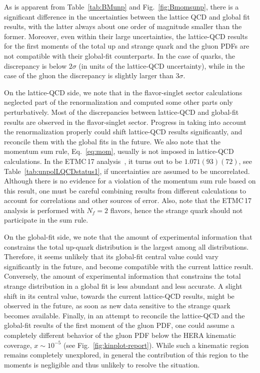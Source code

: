 As is apparent from Table~\ref{tab:BMunp} and Fig.~\ref{fig:Bmomsunp}, there is 
a significant difference in the uncertainties between the lattice QCD and 
global fit results, with the latter always about one order of magnitude 
smaller than the former.
%
Moreover, even within their large uncertainties, the lattice-QCD results 
for the first moments of the total up and strange quark and the gluon PDFs
are not compatible with their global-fit counterparts.
%
In the case of quarks, the discrepancy is below $2\sigma$ (in units of the 
lattice-QCD uncertainty), while in the case of the gluon the discrepancy is
slightly larger than $3\sigma$.

On the lattice-QCD side, we note that in the flavor-singlet sector calculations
neglected part of the renormalization and computed some other parts only 
perturbatively.
%
Most of the discrepancies between lattice-QCD and global-fit results are 
observed in the flavor-singlet sector.
%
Progress in taking into account the renormalization properly
could shift lattice-QCD results significantly, and reconcile them 
with the global fits in the future.
%
We also note that the momentum sum rule, Eq.~\eqref{eq:mom}, usually is not 
imposed in lattice-QCD calculations.
%
In the ETMC\,17 analysis~\cite{Alexandrou:2017oeh}, it turns
out to be $1.071(93)(72)$, see Table~\ref{tab:unpolLQCDstatus1}, if 
uncertainties are assumed to be uncorrelated.
%
Although there is no evidence for a violation of the momentum sum rule 
based on this result, one must be careful combining results from different 
calculations to account for correlations and other sources of error. 
%
Also, note that the ETMC\,17 analysis is performed with $N_f=2$ flavors,
hence the strange quark should not participate in the sum rule.

On the global-fit side, we note that the amount of experimental information 
that constrains the total up-quark distribution is the largest among all 
distributions.
%
Therefore, it seems unlikely that its global-fit central value could vary 
significantly in the future, and become compatible with the current
lattice result.
%
Conversely, the amount of experimental information that constrains the
total strange distribution in a global fit is less abundant and less accurate.
%
A slight shift in its central value, towards the current lattice-QCD results,
might be observed in the future, as soon as new data sensitive to the strange 
quark becomes available.
%
Finally, in an attempt to reconcile the lattice-QCD and the global-fit results
of the first moment of the gluon PDF, one could assume a completely
different behavior of the gluon PDF below the HERA kinematic
coverage, $x\sim 10^{-5}$ (see Fig.~\ref{fig:kinplot-report}).
%
While such a kinematic region remains completely unexplored,
in general the contribution of this region to the moments is negligible
and thus unlikely to resolve the situation. 

